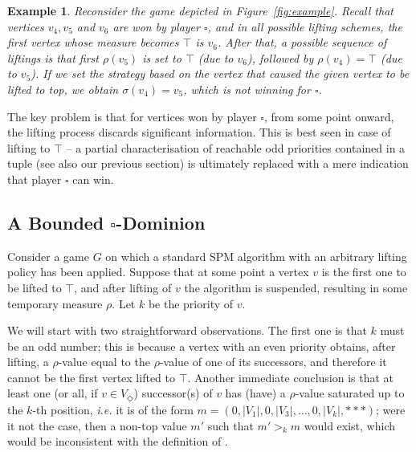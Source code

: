 \documentclass{eptcs}
\newtheorem{exam}{Example}
\newenvironment{example}{\begin{exam} \rm }{\end{exam}}
\newcommand{\odd}{\ensuremath{\square}\xspace}
\newcommand{\even}{\ensuremath{\Diamond}\xspace}
\newcommand{\ie}{\emph{i.e.}\xspace}
\begin{document}
\begin{example} \label{ex:greedytop_wrong} Reconsider the game
depicted in Figure~\ref{fig:example}. Recall that 
vertices $v_4, v_5$ and $v_6$ are won by player $\odd$, and in all
possible lifting schemes, the first vertex whose measure becomes
$\top$ is $v_6$. After that, a possible sequence of liftings is
that first $\rho(v_5)$ is set to $\top$ (due to $v_6$), followed
by $\rho(v_4) = \top$ (due to $v_5$). If we set the strategy
based on the vertex that caused the given vertex to be lifted to top,
we obtain $\sigma(v_4) = v_5$, which is not winning for
$\odd$.

\end{example}
The key problem is that for vertices won by player \odd, from some
point onward, the lifting process discards significant information.
This is best seen in case of lifting to $\top$ -- a partial
characterisation of reachable odd priorities contained in a tuple
(see also our previous section) is ultimately replaced with a mere
indication that player \odd can win.


\subsection{A Bounded $\odd$-Dominion}

Consider a game $G$ on which a standard SPM algorithm with an arbitrary lifting policy has been applied. Suppose that at some point a vertex $v$ is the first one to be lifted to $\top$, and after lifting of $v$ the algorithm is suspended, resulting in some temporary measure $\rho$. Let $k$ be the priority of $v$. 

We will start with two straightforward observations. The first one
is that $k$ must be an odd number; this is because a vertex with an
even priority obtains, after lifting, a $\rho$-value equal to the
$\rho$-value of one of its successors, and therefore it cannot be
the first vertex lifted to $\top$. Another immediate conclusion is
that at least one (or all, if $v \in V_{\even}$) successor(s) of
$v$ has (have)  a $\rho$-value saturated up to the $k$-th position,
\ie it is of the form $m = (0,|V_1|, 0, |V_3|,\dots, 0, |V_k|, ***)$;
were it not the case, then a non-top value $m'$ such that $m' >_{k}
m$ would exist, which would be inconsistent with the definition of
\progname.
\end{document}
